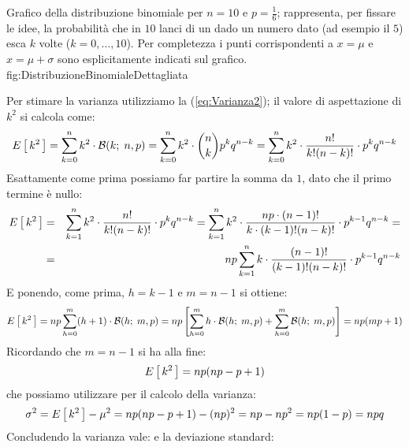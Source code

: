 \panelfig
{}
{Grafico della distribuzione binomiale per $n = 10$ e $p = \frac{1}{6}$;
rappresenta, per fissare le idee, la probabilit\`a che in $10$ lanci di un dado
un numero dato (ad esempio il $5$) esca $k$ volte ($k = 0, \ldots, 10$).
Per completezza i punti corrispondenti a $x = \mu$ e $x = \mu + \sigma$
sono esplicitamente indicati sul grafico.}
{fig:DistribuzioneBinomialeDettagliata}

Per stimare la varianza 
utilizziamo la (\ref{eq:Varianza2}); il valore di aspettazione di $k^2$ 
si calcola come:
$$
\expect{k^2} = \dsum{k^2 \cdot \binomialpdf{k}{n, p}}{k}{0}{n} =
\dsum{k^2 \cdot \binom{n}{k}p^k q^{n-k}}{k}{0}{n} =
\dsum{k^2 \cdot \binomial{n}{k} \cdot p^k q^{n-k}}{k}{0}{n}
$$
Esattamente come prima possiamo far partire la somma da $1$, dato che
il primo termine \`e nullo:
\begin{eqnarray*}
\expect{k^2} & = & \dsum{k^2 \cdot \binomial{n}{k}}{k}{1}{n}
\cdot p^k q^{n - k} =
\dsum{k^2 \cdot \frac{np \cdot (n -1)!}{k \cdot (k - 1)! (n - k)!}}{k}{1}{n}
\cdot p^{k-1} q^{n - k} =\\
& = & np \dsum{k \cdot \frac{(n - 1)!}{(k - 1)!(n - k)!}}{k}{1}{n}
\cdot p^{k - 1} q^{n - k}
\end{eqnarray*}
E ponendo, come prima, $h = k - 1$ e $m = n - 1$ si ottiene:
$$
\expect{k^2} = np\dsum{(h + 1) \cdot \binomialpdf{h}{m, p}}{h}{0}{m} =
np \left[ \dsum{h\cdot \binomialpdf{h}{m, p}}{h}{0}{m} +
\dsum{\binomialpdf{h}{m, p}}{h}{0}{m} \right] = np(mp + 1)
$$
Ricordando che $m = n - 1$ si ha alla fine:
$$
\expect{k^2} = np(np - p + 1)
$$
che possiamo utilizzare per il calcolo della varianza:
$$
\sigma^2 = \expect{k^2} - \mu^2 = np(np - p + 1) - (np)^2 =
np - np^2 = np(1 - p) = npq
$$
Concludendo la varianza vale:
e la deviazione standard:

